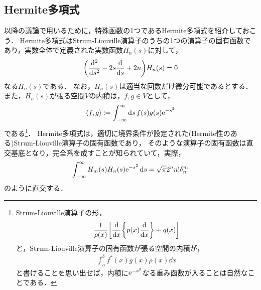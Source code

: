 \documentclass{report}
\begin{document}
  \subsection{Hermite多項式}
    以降の議論で用いるために，特殊函数の1つであるHermite多項式を紹介しておこう．
    Hermite多項式はStrum-Liouville演算子のうちの1つの演算子の固有函数であり，実数全体で定義された実数函数$H_n(s)$に対して，
    \begin{align}
      \qty(\dv[2]{s} - 2s\dv{s} + 2n)H_n(s) = 0
    \end{align}
    なる$H_n(s)$である．
    なお，$H_n(s)$は適当な回数だけ微分可能であるとする．
    また，$H_n(s)$が張る空間$V$の内積は，$f, g\in V$として，
    \begin{align}
      \left\langle f, g \right\rangle \coloneqq \int_{-\infty}^{\infty}\dd{s}f(s)g(s)\mathrm{e}^{-s^2}
    \end{align}
    である\footnote{
      Strum-Liouville演算子の形，
      \begin{align*}
        \frac{1}{\rho(x)}\qty[\dv{x}\qty{p(x)\dv{x}} + q(x)]
      \end{align*}
      と，Strum-Liouville演算子の固有函数が張る空間の内積が，
      \begin{align*}
        \int_{a}^{b} f^*(x)g(x)\rho(x)\dd{x}
      \end{align*}
      と書けることを思い出せば，内積に$\mathrm{e}^{-s^2}$なる重み函数が入ることは自然なことである．
    }．
    Hermite多項式は，適切に境界条件が設定された(Hermite性のある)Strum-Liouville演算子の固有函数であり，
    そのような演算子の固有函数は直交基底となり，完全系を成すことが知られていて，実際，
    \begin{align}
      \int_{-\infty}^{\infty}H_m(s)H_n(s)\mathrm{e}^{-s^2}\dd{s} = \sqrt{\pi}2^nn!\delta_n^m
    \end{align}
    のように直交する．
\end{document}
